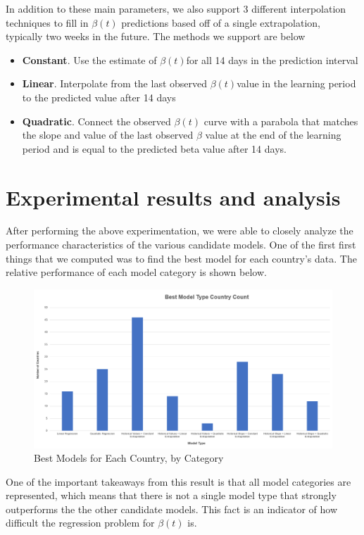 \documentclass[11pt]{article}
\begin{document}
In addition to these main parameters, we also support 3 different interpolation techniques to fill in $\beta(t)$ predictions based off of a single extrapolation, typically two weeks in the future. The methods we support are below
\begin{itemize}
    \item \textbf{Constant}. Use the estimate of $\beta(t)$for all 14 days in the prediction interval
    \item \textbf{Linear}. Interpolate from the last observed $\beta(t)$value in the learning period to the predicted value after 14 days
    \item \textbf{Quadratic}. Connect the observed $\beta(t)$ curve with a parabola that matches the slope and value of the last observed $\beta$ value at the end of the learning period and is equal to the predicted beta value after 14 days.
\end{itemize}

\section{Experimental results and analysis}
After performing the above experimentation, we were able to closely analyze the performance characteristics of the various candidate models. One of the first first things that we computed was to find the best model for each country's data. The relative performance of each model category is shown below.

\begin{figure}[h]
    \includegraphics[width=16cm]{images/CountryCount.png}
    \centering
    \caption{Best Models for Each Country, by Category}
    \label{fig:country-count}
\end{figure}

One of the important takeaways from this result is that all model categories are represented, which means that there is not a single model type that strongly outperforms the the other candidate models. This fact is an indicator of how difficult the regression problem for $\beta(t)$ is.
\end{document}
